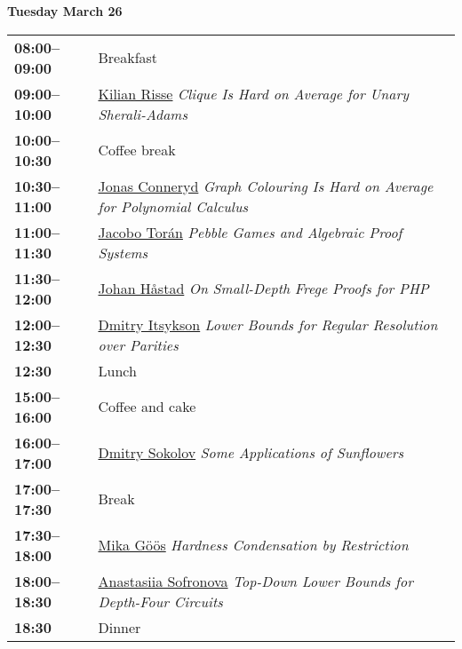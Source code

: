 \documentclass[11pt]{article}
\newcommand{\scheduletablewidth}{5.06in}
\begin{document}
\noindent\begin{minipage}{\textwidth}
\begin{center} {\bf\large Tuesday March 26} \end{center}
\begin{tabular}{ p{0.9in} p{\scheduletablewidth} }
{\bf 08:00--09:00}  & Breakfast\\

{\bf 09:00--10:00} & \hyperref[Risse]{Kilian Risse}
{\em Clique Is Hard on Average for Unary Sherali-Adams} \\

{\bf 10:00--10:30} & {Coffee break} \\

{\bf 10:30--11:00} & \hyperref[Conneryd]{Jonas Conneryd}
{\em Graph Colouring Is Hard on Average for Polynomial Calculus} \\

{\bf 11:00--11:30} & \hyperref[Toran]{Jacobo Tor\'{a}n}
{\em Pebble Games and Algebraic Proof Systems} \\

{\bf 11:30--12:00} & \hyperref[Hastad]{Johan H\aa stad}
{\em On Small-Depth Frege Proofs for PHP} \\

{\bf 12:00--12:30} & \hyperref[Itsykson]{Dmitry Itsykson}
{\em Lower Bounds for Regular Resolution over Parities} \\



{\bf 12:30%
} &  Lunch\\

{\bf 15:00--16:00} &  Coffee and cake \\

{\bf 16:00--17:00} & \hyperref[Sokolov]{Dmitry Sokolov}
{\em Some Applications of Sunflowers} \\

{\bf 17:00--17:30} & {Break} \\

{\bf 17:30--18:00} & \hyperref[Goos]{Mika G\"{o}\"{o}s}
{\em Hardness Condensation by Restriction} \\

{\bf 18:00--18:30} & \hyperref[Sofronova]{Anastasiia Sofronova}
{\em Top-Down Lower Bounds for Depth-Four Circuits} \\

{\bf 18:30%
} & Dinner \\
\end{tabular}
\end{minipage}
\end{document}
